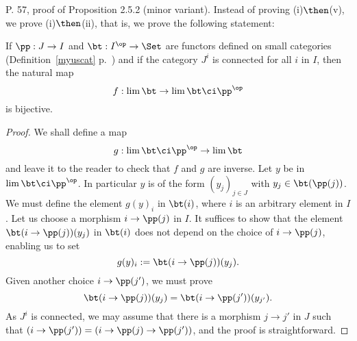 \documentclass[12pt]{article}
\theoremstyle{remark}
\theoremstyle{definition}
\begin{document}
\begin{s}
P. 57, proof of Proposition 2.5.2 (minor variant). Instead of proving (i)$\then$(v), we prove (i)$\then$(ii), that is, we prove the following statement:

\begin{lem}
If $\pp:J\to I$ and $\bt:I^{\op}\to\Set$ are functors defined on small categories (Definition~\ref{myuscat} p.~) and if the category $J^i$ is connected for all $i$ in $I$, then the natural map 
$$
f:\lim\bt\to\lim\bt\ci\pp^{\op}
$$ 
is bijective. 
\end{lem}

\begin{proof}
We shall define a map 
$$
g:\lim\bt\ci\pp^{\op}\to\lim\bt
$$ 
and leave it to the reader to check that $f$ and $g$ are inverse. Let $y$ be in $\lim\bt\ci\pp^{\op}$. In particular $y$ is of the form $(y_j)_{j\in J}$ with $y_j\in\bt(\pp(j))$. We must define the element $g(y)_i$ in $\bt(i)$, where $i$ is an arbitrary element in $I$. Let us choose a morphism $i\to\pp(j)$ in $I$. It suffices to show that the element $\bt(i\to\pp(j))(y_j)$ in $\bt(i)$ does not depend on the choice of $i\to\pp(j)$, enabling us to set $$g(y)_i:=\bt(i\to\pp(j))(y_j).$$ Given another choice $i\to\pp(j')$, we must prove $$\bt(i\to\pp(j))(y_j)=\bt(i\to\pp(j'))(y_{j'}).$$ As $J^i$ is connected, we may assume that there is a morphism $j\to j'$ in $J$ such that $(i\to\pp(j'))=(i\to\pp(j)\to\pp(j'))$, and the proof is straightforward. %
\end{proof}
\end{s}

%
\end{document}
